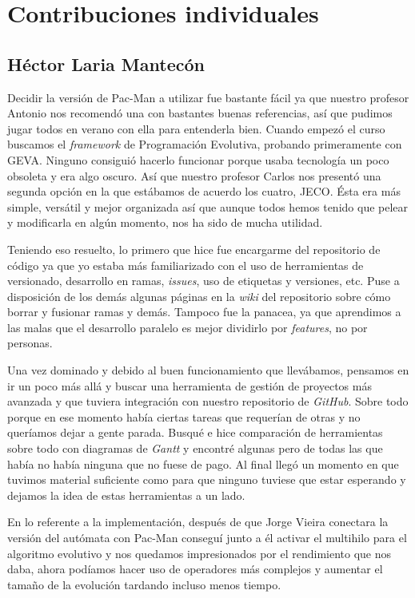 \chapter{Contribuciones individuales}

\section{Héctor Laria Mantecón}
Decidir la versión de Pac-Man a utilizar fue bastante fácil ya que nuestro profesor Antonio nos recomendó una con bastantes buenas referencias, así que pudimos jugar todos en verano con ella para entenderla bien. Cuando empezó el curso buscamos el \textit{framework} de Programación Evolutiva, probando primeramente con GEVA. Ninguno consiguió hacerlo funcionar porque usaba tecnología un poco obsoleta y era algo oscuro. Así que nuestro profesor Carlos nos presentó una segunda opción en la que estábamos de acuerdo los cuatro, JECO. Ésta era más simple, versátil y mejor organizada así que aunque todos hemos tenido que pelear y modificarla en algún momento, nos ha sido de mucha utilidad.

Teniendo eso resuelto, lo primero que hice fue encargarme del repositorio de código ya que yo estaba más familiarizado con el uso de herramientas de versionado, desarrollo en ramas, \textit{issues}, uso de etiquetas y versiones, etc. Puse a disposición de los demás algunas páginas en la \textit{wiki} del repositorio sobre cómo borrar y fusionar ramas y demás. Tampoco fue la panacea, ya que aprendimos a las malas que el desarrollo paralelo es mejor dividirlo por \textit{features}, no por personas.

Una vez dominado y debido al buen funcionamiento que llevábamos, pensamos en ir un poco más allá y buscar una herramienta de gestión de proyectos más avanzada y que tuviera integración con nuestro repositorio de \textit{GitHub}. Sobre todo porque en ese momento había ciertas tareas que requerían de otras y no queríamos dejar a gente parada. Busqué e hice comparación de herramientas sobre todo con diagramas de \textit{Gantt} y encontré algunas pero de todas las que había no había ninguna que no fuese de pago. Al final llegó un momento en que tuvimos material suficiente como para que ninguno tuviese que estar esperando y dejamos la idea de estas herramientas a un lado.

En lo referente a la implementación, después de que Jorge Vieira conectara la versión del autómata con Pac-Man conseguí junto a él activar el multihilo para el algoritmo evolutivo y nos quedamos impresionados por el rendimiento que nos daba, ahora podíamos hacer uso de operadores más complejos y aumentar el tamaño de la evolución tardando incluso menos tiempo.

